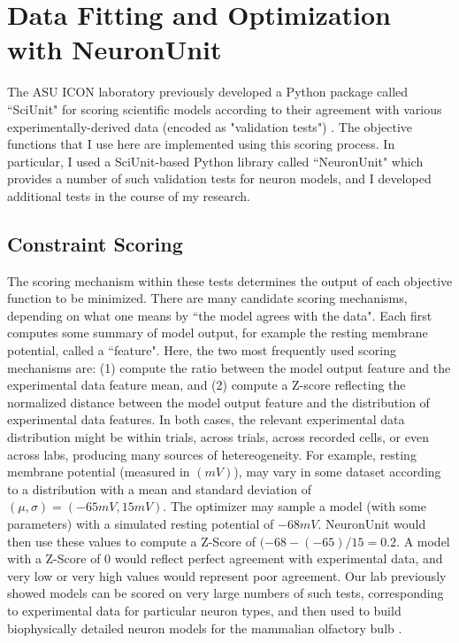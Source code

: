 \section{Data Fitting and Optimization with NeuronUnit}
\label{sec:neuronunit}
The ASU ICON laboratory previously developed a Python package called ``SciUnit" for scoring scientific models according to their agreement with various experimentally-derived data (encoded as "validation tests") \citep{omar2014collaborative}.  The objective functions that I use here are implemented using this scoring process.
In particular, I used a SciUnit-based Python library called ``NeuronUnit" which provides a number of such validation tests for neuron models, and I developed additional tests in the course of my research.

\subsection{Constraint Scoring}
The scoring mechanism within these tests determines the output of each objective function to be minimized.  There are many candidate scoring mechanisms, depending on what one means by ``the model agrees with the data".  Each first computes some summary of model output, for example the resting membrane potential, called a ``feature".
Here, the two most frequently used scoring mechanisms are: (1) compute the ratio between the model output feature and the experimental data feature mean, and (2) compute a Z-score reflecting the normalized distance between the model output feature and the distribution of experimental data features.
In both cases, the relevant experimental data distribution might be within trials, across trials, across recorded cells, or even across labs, producing many sources of hetereogeneity.
For example, resting membrane potential (measured in $(mV)$), may vary in some dataset according to a distribution with a mean and standard deviation of $(\mu,\sigma)=(-65mV,15mV)$.
The optimizer may sample a model (with some parameters) with a simulated resting potential of $-68mV$.  
NeuronUnit would then use these values to compute a Z-Score of $(-68 - (-65)/15 = 0.2$.
A model with a Z-Score of 0 would reflect perfect agreement with experimental data, and very low or very high values would represent poor agreement.
Our lab previously showed models can be scored on very large numbers of such tests, corresponding to experimental data for particular neuron types, and then used to build biophysically detailed neuron models for the mammalian olfactory bulb \citep{birgiolas2019towards}.

